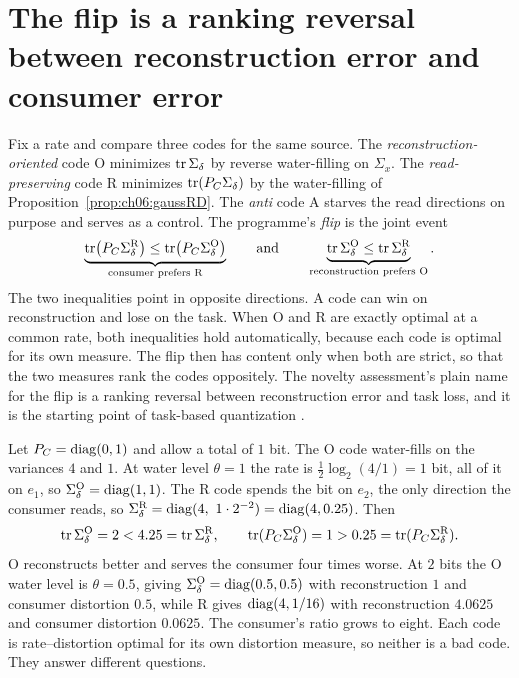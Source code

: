 
\section{The flip is a ranking reversal between reconstruction error and consumer error}\label{sec:ch06:flip}

Fix a rate and compare three codes for the same source. The \emph{reconstruction-oriented} code O minimizes $\operatorname{tr}\Sigma_\delta$ by reverse water-filling on $\Sigma_x$. The \emph{read-preserving} code R minimizes $\operatorname{tr}(P_C\Sigma_\delta)$ by the water-filling of Proposition~\ref{prop:ch06:gaussRD}. The \emph{anti} code A starves the read directions on purpose and serves as a control. The programme's \emph{flip} is the joint event
\begin{equation}\label{eq:ch06:flip}
\underbrace{\operatorname{tr}\!\big(P_C\Sigma_\delta^{\mathrm R}\big)\le\operatorname{tr}\!\big(P_C\Sigma_\delta^{\mathrm O}\big)}_{\text{consumer prefers R}}
\qquad\text{and}\qquad
\underbrace{\operatorname{tr}\Sigma_\delta^{\mathrm O}\le\operatorname{tr}\Sigma_\delta^{\mathrm R}}_{\text{reconstruction prefers O}} .
\end{equation}
The two inequalities point in opposite directions. A code can win on reconstruction and lose on the task. When O and R are exactly optimal at a common rate, both inequalities hold automatically, because each code is optimal for its own measure. The flip then has content only when both are strict, so that the two measures rank the codes oppositely. The novelty assessment's plain name for the flip is a ranking reversal between reconstruction error and task loss, and it is the starting point of task-based quantization \cite{shlezinger2019}.

\begin{example}[The flip for $\Sigma_x=\diag(4,1)$ and a consumer that reads $e_2$]\label{ex:ch06:flip}
Let $P_C=\operatorname{diag}(0,1)$ and allow a total of $1$ bit. The O code water-fills on the variances $4$ and $1$. At water level $\theta=1$ the rate is $\tfrac12\log_2(4/1)=1$ bit, all of it on $e_1$, so $\Sigma_\delta^{\mathrm O}=\operatorname{diag}(1,1)$. The R code spends the bit on $e_2$, the only direction the consumer reads, so $\Sd^{\mathrm R}=\diag(4,\ 1\cdot2^{-2})=\diag(4,0.25)$. Then
\[
\operatorname{tr}\Sigma_\delta^{\mathrm O}=2<4.25=\operatorname{tr}\Sigma_\delta^{\mathrm R},\qquad
\operatorname{tr}(P_C\Sigma_\delta^{\mathrm O})=1>0.25=\operatorname{tr}(P_C\Sigma_\delta^{\mathrm R}).
\]
O reconstructs better and serves the consumer four times worse. At $2$ bits the O water level is $\theta=0.5$, giving $\Sigma_\delta^{\mathrm O}=\operatorname{diag}(0.5,0.5)$ with reconstruction $1$ and consumer distortion $0.5$, while R gives $\operatorname{diag}(4,1/16)$ with reconstruction $4.0625$ and consumer distortion $0.0625$. The consumer's ratio grows to eight. Each code is rate--distortion optimal for its own distortion measure, so neither is a bad code. They answer different questions.
\end{example}

